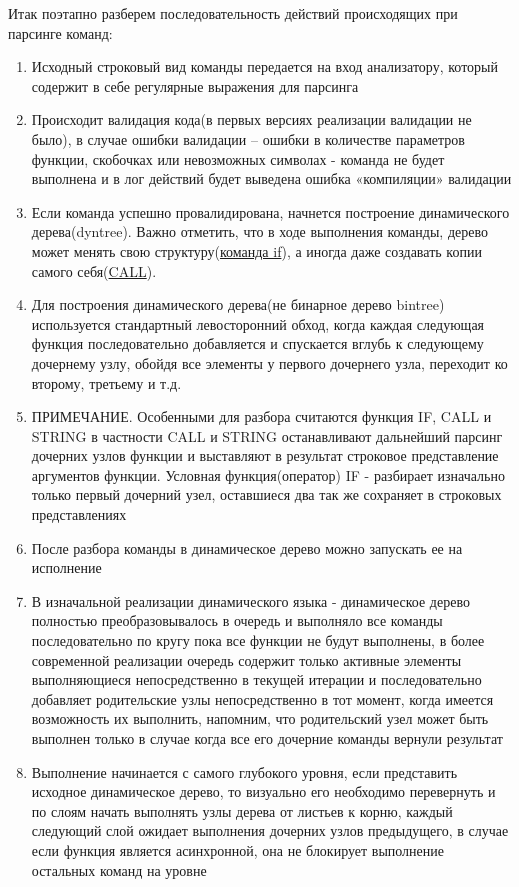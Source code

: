 \documentclass[../index.tex]{subfiles}
\begin{document}
Итак поэтапно разберем последовательность действий происходящих при парсинге команд:
\begin{enumerate}
    \item Исходный строковый вид команды передается на вход анализатору, который содержит в себе регулярные выражения для парсинга
    \item Происходит валидация кода(в первых версиях реализации валидации не было), в случае ошибки валидации -- ошибки в количестве параметров функции, скобочках или невозможных символах - команда не будет выполнена и в лог действий будет выведена ошибка «компиляции» валидации
    \item Если команда успешно провалидирована, начнется построение динамического дерева(\gls{dyntree}). Важно отметить, что в ходе выполнения команды, дерево может менять свою структуру(\hyperref[sec:fif]{команда if}), а иногда даже создавать копии самого себя(\hyperref[sec:fcall]{CALL}). 
    \item Для построения динамического дерева(не бинарное дерево \gls{bintree}) используется стандартный левосторонний обход, когда каждая следующая функция последовательно добавляется и спускается вглубь к следующему дочернему узлу, обойдя все элементы у первого дочернего узла, переходит ко второму, третьему и т.д.
    \item ПРИМЕЧАНИЕ. Особенными для разбора считаются функция IF, CALL и STRING в частности CALL и STRING останавливают дальнейший парсинг дочерних узлов функции и выставляют в результат строковое представление аргументов функции. Условная функция(оператор) IF - разбирает изначально только первый дочерний узел, оставшиеся два так же сохраняет в строковых представлениях
    \item После разбора команды в динамическое дерево можно запускать ее на исполнение 
    \item В изначальной реализации динамического языка - динамическое дерево полностью преобразовывалось в очередь и выполняло все команды последовательно по кругу пока все функции не будут выполнены, в более современной реализации очередь содержит только активные элементы выполняющиеся непосредственно в текущей итерации и последовательно добавляет родительские узлы непосредственно в тот момент, когда имеется возможность их выполнить, напомним, что родительский узел может быть выполнен только в случае когда все его дочерние команды вернули результат
    \item Выполнение начинается с самого глубокого уровня, если представить исходное динамическое дерево, то визуально его необходимо перевернуть и по слоям начать выполнять узлы дерева от листьев к корню, каждый следующий слой ожидает выполнения дочерних узлов предыдущего, в случае если функция является асинхронной, она не блокирует выполнение остальных команд на уровне

\end{enumerate}
\end{document}
